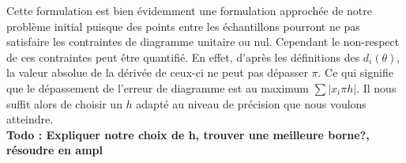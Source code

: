Cette formulation est bien évidemment une formulation approchée de notre problème initial puisque des points entre les échantillons pourront ne pas satisfaire les contraintes de diagramme unitaire ou nul. Cependant le non-respect de ces contraintes peut être quantifié. En effet, d'après les définitions des $d_i(\theta)$, la valeur absolue de la dérivée de ceux-ci ne peut pas dépasser $\pi$. Ce qui signifie que le dépassement de l'erreur de diagramme est au maximum $\sum |x_i\pi h|$. Il nous suffit alors de choisir un $h$ adapté au niveau de précision que nous voulons atteindre. 
\\
\textbf{Todo : Expliquer notre choix de h, trouver une meilleure borne?, résoudre en ampl}		